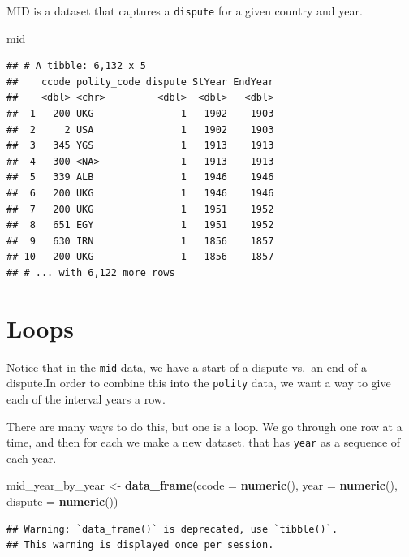 \documentclass[]{book}
\newenvironment{Shaded}{\begin{snugshade}}{\end{snugshade}}
\newcommand{\KeywordTok}[1]{\textcolor[rgb]{0.13,0.29,0.53}{\textbf{#1}}}
\newcommand{\DataTypeTok}[1]{\textcolor[rgb]{0.13,0.29,0.53}{#1}}
\newcommand{\StringTok}[1]{\textcolor[rgb]{0.31,0.60,0.02}{#1}}
\newcommand{\NormalTok}[1]{#1}
\theoremstyle{definition}
\theoremstyle{definition}
\theoremstyle{definition}
\theoremstyle{remark}
\begin{document}
MID is a dataset that captures a \texttt{dispute} for a given country
and year.

\begin{Shaded}
\begin{Highlighting}[]
\NormalTok{mid}
\end{Highlighting}
\end{Shaded}

\begin{verbatim}
## # A tibble: 6,132 x 5
##    ccode polity_code dispute StYear EndYear
##    <dbl> <chr>         <dbl>  <dbl>   <dbl>
##  1   200 UKG               1   1902    1903
##  2     2 USA               1   1902    1903
##  3   345 YGS               1   1913    1913
##  4   300 <NA>              1   1913    1913
##  5   339 ALB               1   1946    1946
##  6   200 UKG               1   1946    1946
##  7   200 UKG               1   1951    1952
##  8   651 EGY               1   1951    1952
##  9   630 IRN               1   1856    1857
## 10   200 UKG               1   1856    1857
## # ... with 6,122 more rows
\end{verbatim}

\section{Loops}\label{loops}

Notice that in the \texttt{mid} data, we have a start of a dispute
vs.~an end of a dispute.In order to combine this into the
\texttt{polity} data, we want a way to give each of the interval years a
row.

There are many ways to do this, but one is a loop. We go through one row
at a time, and then for each we make a new dataset. that has
\texttt{year} as a sequence of each year.

\begin{Shaded}
\begin{Highlighting}[]
\NormalTok{mid_year_by_year <-}\StringTok{ }\KeywordTok{data_frame}\NormalTok{(}\DataTypeTok{ccode =} \KeywordTok{numeric}\NormalTok{(),}
                               \DataTypeTok{year =} \KeywordTok{numeric}\NormalTok{(),}
                               \DataTypeTok{dispute =} \KeywordTok{numeric}\NormalTok{())}
\end{Highlighting}
\end{Shaded}

\begin{verbatim}
## Warning: `data_frame()` is deprecated, use `tibble()`.
## This warning is displayed once per session.
\end{verbatim}
\end{document}
